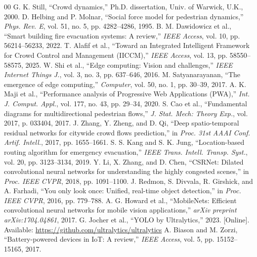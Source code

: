 \documentclass[conference]{IEEEtran}
\begin{document}
\begin{thebibliography}{00}
 G. K. Still, ``Crowd dynamics,'' Ph.D. dissertation, Univ. of Warwick, U.K., 2000.
 D. Helbing and P. Molnar, ``Social force model for pedestrian dynamics,'' \textit{Phys. Rev. E}, vol. 51, no. 5, pp. 4282--4286, 1995.
 B. M. Dawidowicz et al., ``Smart building fire evacuation systems: A review,'' \textit{IEEE Access}, vol. 10, pp. 56214--56233, 2022.
 T. Alafif et al., ``Toward an Integrated Intelligent Framework for Crowd Control and Management (IICCM),'' \textit{IEEE Access}, vol. 13, pp. 58550--58575, 2025.
 W. Shi et al., ``Edge computing: Vision and challenges,'' \textit{IEEE Internet Things J.}, vol. 3, no. 3, pp. 637--646, 2016.
 M. Satyanarayanan, ``The emergence of edge computing,'' \textit{Computer}, vol. 50, no. 1, pp. 30--39, 2017.
 A. K. Maji et al., ``Performance analysis of Progressive Web Applications (PWA),'' \textit{Int. J. Comput. Appl.}, vol. 177, no. 43, pp. 29--34, 2020.
 S. Cao et al., ``Fundamental diagrams for multidirectional pedestrian flows,'' \textit{J. Stat. Mech: Theory Exp.}, vol. 2017, p. 033404, 2017.
 J. Zhang, Y. Zheng, and D. Qi, ``Deep spatio-temporal residual networks for citywide crowd flows prediction,'' in \textit{Proc. 31st AAAI Conf. Artif. Intell.}, 2017, pp. 1655--1661.
 S. S. Kang and S. K. Jung, ``Location-based routing algorithm for emergency evacuation,'' \textit{IEEE Trans. Intell. Transp. Syst.}, vol. 20, pp. 3123--3134, 2019.
 Y. Li, X. Zhang, and D. Chen, ``CSRNet: Dilated convolutional neural networks for understanding the highly congested scenes,'' in \textit{Proc. IEEE CVPR}, 2018, pp. 1091--1100.
 J. Redmon, S. Divvala, R. Girshick, and A. Farhadi, ``You only look once: Unified, real-time object detection,'' in \textit{Proc. IEEE CVPR}, 2016, pp. 779--788.
 A. G. Howard et al., ``MobileNets: Efficient convolutional neural networks for mobile vision applications,'' \textit{arXiv preprint arXiv:1704.04861}, 2017.
 G. Jocher et al., ``YOLO by Ultralytics,'' 2023. [Online]. Available: \url{https://github.com/ultralytics/ultralytics}
 A. Biason and M. Zorzi, ``Battery-powered devices in IoT: A review,'' \textit{IEEE Access}, vol. 5, pp. 15152--15165, 2017.

\end{thebibliography}
\end{document}
